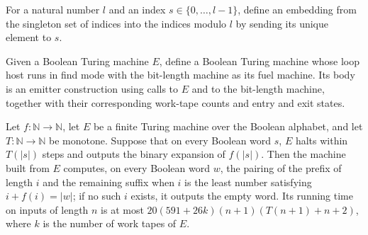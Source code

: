 \begin{definition}
\label{Turing.FinTM.emitterP2OneIndex}
\leanok
For a natural number $l$ and an index $s\in\{0,\ldots,l-1\}$, define an embedding from
the singleton set of indices into the indices modulo $l$ by sending its unique element
to $s$.
\end{definition}

\begin{definition}
\label{Turing.FinTM.splitSolveWithTM}
\leanok
{}
Given a Boolean Turing machine $E$, define a Boolean Turing machine whose loop host runs
in find mode with the bit-length machine as its fuel machine. Its body is an emitter
construction using calls to $E$ and to the bit-length machine, together with their
corresponding work-tape counts and entry and exit states.
\end{definition}

\begin{theorem}
\label{Turing.FinTM.splitSolveWithTM_computes}
\leanok
{}
Let $f:\mathbb{N}\to\mathbb{N}$, let $E$ be a finite Turing machine over the Boolean
alphabet, and let $T:\mathbb{N}\to\mathbb{N}$ be monotone. Suppose that on every Boolean
word $s$, $E$ halts within $T(|s|)$ steps and outputs the binary expansion of $f(|s|)$.
Then the machine built from $E$ computes, on every Boolean word $w$, the pairing of the
prefix of length $i$ and the remaining suffix when $i$ is the least number satisfying
$i+f(i)=|w|$; if no such $i$ exists, it outputs the empty word. Its running time on
inputs of length $n$ is at most $20(591+26k)(n+1)(T(n+1)+n+2)$, where $k$ is the number
of work tapes of $E$.
\end{theorem}

